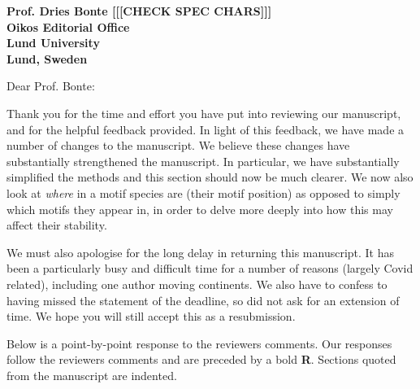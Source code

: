 \documentclass[12pt]{letter}
\begin{document}
\begin{letter}{\bf Prof. Dries Bonte [[[CHECK SPEC CHARS]]]\\
Oikos Editorial Office \\
Lund University \\
Lund, Sweden}


\opening{Dear Prof. Bonte:}

Thank you for the time and effort you have put into reviewing our manuscript, and for the helpful feedback provided. In light of this feedback, we have made a number of changes to the manuscript. We believe these changes have substantially strengthened the manuscript. In particular, we have substantially simplified the methods and this section should now be much clearer. We now also look at \emph{where} in a motif species are (their motif position) as opposed to simply which motifs they appear in, in order to delve more deeply into how this may affect their stability. 

We must also apologise for the long delay in returning this manuscript. It has been a particularly busy and difficult time for a number of reasons (largely Covid related), including one author moving continents. We also have to confess to having missed the statement of the deadline, so did not ask for an extension of time. We hope you will still accept this as a resubmission. 

Below is a point-by-point response to the reviewers comments. Our responses follow the reviewers comments and are preceded by a bold \textbf{R}. Sections quoted from the manuscript are indented.






\end{letter}
\end{document}
